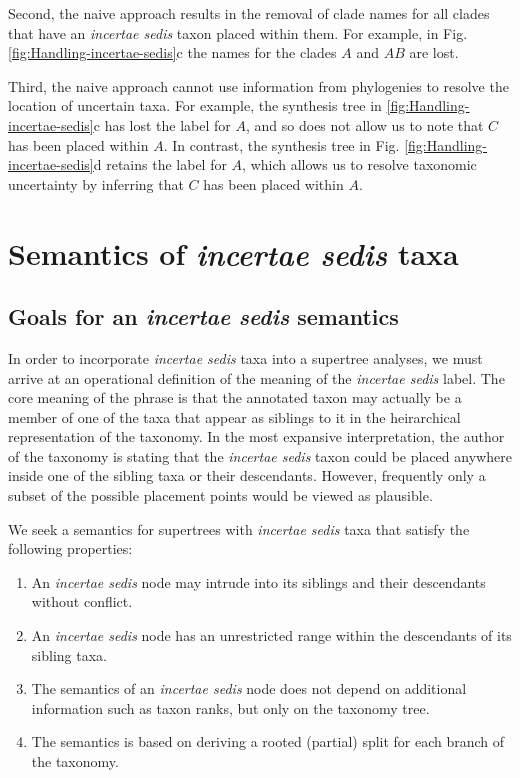 \documentclass[english]{article}
\begin{document}
Second, the naive approach results in the removal of clade names for all clades that
have an \emph{incertae sedis} taxon placed within them.  For example, in Fig.
\ref{fig:Handling-incertae-sedis}c the names for the clades $A$ and $AB$ are lost.

Third, the naive approach cannot use information from phylogenies to resolve the
location of uncertain taxa.  For example, the synthesis tree in
\ref{fig:Handling-incertae-sedis}c has lost the label for $A$, and so does not
allow us to note that $C$ has been placed within $A$.  In contrast, the synthesis
tree in Fig. \ref{fig:Handling-incertae-sedis}d retains the label for $A$, which
allows us to resolve taxonomic uncertainty by inferring that $C$ has been placed
within $A$.

\section{\label{sec:Semantics-of-incertae}Semantics of \emph{incertae
sedis} taxa}

\subsection{Goals for an \emph{incertae sedis} semantics}

In order to incorporate \emph{incertae sedis }taxa into a supertree
analyses, we must arrive at an operational definition of the meaning
of the \emph{incertae sedis} label.
The core meaning of the phrase is
that the annotated taxon may actually be a member of one of the taxa
that appear as siblings to it in the heirarchical representation of
the taxonomy.
In the most expansive interpretation, the author of the
taxonomy is stating that the \emph{incertae sedis} taxon could be
placed anywhere inside one of the sibling taxa or their descendants.
However, frequently only a subset of the possible placement points
would be viewed as plausible.

We seek a semantics for supertrees with \emph{incertae sedis }taxa
that satisfy the following properties:
\begin{enumerate}
    \item An \emph{incertae sedis} node may intrude into its siblings and their descendants without conflict.
    \item An \emph{incertae sedis} node has an unrestricted range within the descendants of its sibling taxa.
    \item The semantics of an \emph{incertae sedis} node does not depend on additional information such as taxon ranks, but only on the taxonomy tree.
    \item The semantics is based on deriving a rooted (partial) split for each branch of the taxonomy.
\end{enumerate}
\end{document}
